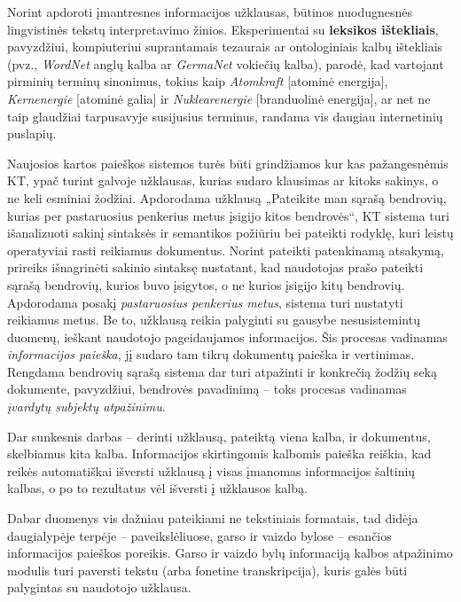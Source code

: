 \begin{multicols}{2}
 Norint apdoroti įmantresnes informacijos užklausas, būtinos nuodugnesnės lingvistinės tekstų interpretavimo žinios. Eksperimentai su \textbf{leksikos ištekliais}, pavyzdžiui, kompiuteriui suprantamais tezaurais ar ontologiniais kalbų ištekliais (pvz., \textit{WordNet} anglų kalba ar \textit{GermaNet} vokiečių kalba), parodė, kad vartojant pirminių terminų sinonimus, tokius kaip \textit{Atomkraft} [atominė energija], \textit{Kernenergie} [atominė galia] ir \textit{Nuklearenergie} [branduolinė energija], ar net ne taip glaudžiai tarpusavyje susijusius terminus, randama vis daugiau internetinių puslapių. 

Naujosios kartos paieškos sistemos turės būti grindžiamos kur kas pažangesnėmis KT, ypač turint galvoje užklausas, kurias sudaro klausimas ar kitoks sakinys, o ne keli esminiai žodžiai. Apdorodama užklausą „Pateikite man sąrašą bendrovių, kurias per pastaruosius penkerius metus įsigijo kitos bendrovės“, KT sistema turi išanalizuoti sakinį sintaksės ir semantikos požiūriu bei pateikti rodyklę, kuri leistų operatyviai rasti reikiamus dokumentus. Norint pateikti patenkinamą atsakymą, prireiks išnagrinėti sakinio sintaksę nustatant, kad naudotojas prašo pateikti sąrašą bendrovių, kurios buvo įsigytos, o ne kurios įsigijo kitų bendrovių. Apdorodama posakį \textit{pastaruosius penkerius metus}, sistema turi nustatyti reikiamus metus. Be to, užklausą reikia palyginti su gausybe nesusistemintų duomenų, ieškant naudotojo pageidaujamos informacijos. Šis procesas vadinamas \textit{informacijos paieška}, jį sudaro tam tikrų dokumentų paieška ir vertinimas. Rengdama bendrovių sąrašą sistema dar turi atpažinti ir konkrečią žodžių seką dokumente, pavyzdžiui, bendrovės pavadinimą – toks procesas vadinamas \textit{įvardytų subjektų atpažinimu}.  


Dar sunkesnis darbas – derinti užklausą, pateiktą viena kalba, ir dokumentus, skelbiamus kita kalba. Informacijos skirtingomis kalbomis paieška reiškia, kad reikės automatiškai išversti užklausą į visas įmanomas informacijos šaltinių kalbas, o po to rezultatus vėl išversti į užklausos kalbą.   

    Dabar duomenys vis dažniau pateikiami ne tekstiniais formatais, tad didėja daugialypėje terpėje – paveikslėliuose, garso ir vaizdo bylose – esančios informacijos paieškos poreikis. Garso ir vaizdo bylų informaciją kalbos atpažinimo modulis turi paversti tekstu (arba fonetine transkripcija), kuris galės būti palygintas su naudotojo užklausa.   


\end{multicols}

